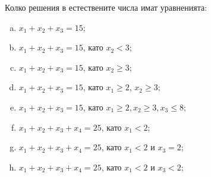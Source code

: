 \begin{problem}
  Колко решения в естествените числа имат уравненията:
  \begin{enumerate}[a)]
  \item
    $x_1+x_2+x_3 = 15$;
  \item
    $x_1 + x_2 + x_3 = 15$, като $x_2 < 3$;
  \item
    $x_1 + x_2 + x_3 = 15$, като $x_2 \geq 3$;
  \item
    $x_1+x_2+x_3 = 15$, като $x_1 \geq 2$, $x_2 \geq 3$;
  \item
    $x_1+x_2+x_3 = 15$, като $x_1 \geq 2, x_2 \geq 3, x_3 \leq 8$;
  \item
    $x_1+x_2+x_3+x_4 = 25$, като $x_1 < 2$;
  \item
    $x_1+x_2+x_3+x_4 = 25$, като $x_1 < 2$ и $x_3 = 2$;
  \item
    $x_1+x_2+x_3+x_4 = 25$, като $x_1 < 2$ и $x_3 < 2$;
  \end{enumerate}
\end{problem}
